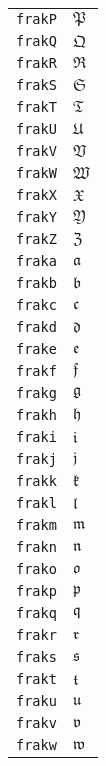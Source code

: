 \begin{longtable}{ll}
\texttt{frakP}&${}\mathfrak{P} {}$\\
\texttt{frakQ}&${}\mathfrak{Q} {}$\\
\texttt{frakR}&${}\mathfrak{R} {}$\\
\texttt{frakS}&${}\mathfrak{S} {}$\\
\texttt{frakT}&${}\mathfrak{T} {}$\\
\texttt{frakU}&${}\mathfrak{U} {}$\\
\texttt{frakV}&${}\mathfrak{V} {}$\\
\texttt{frakW}&${}\mathfrak{W} {}$\\
\texttt{frakX}&${}\mathfrak{X} {}$\\
\texttt{frakY}&${}\mathfrak{Y} {}$\\
\texttt{frakZ}&${}\mathfrak{Z} {}$\\
\texttt{fraka}&${}\mathfrak{a} {}$\\
\texttt{frakb}&${}\mathfrak{b} {}$\\
\texttt{frakc}&${}\mathfrak{c} {}$\\
\texttt{frakd}&${}\mathfrak{d} {}$\\
\texttt{frake}&${}\mathfrak{e} {}$\\
\texttt{frakf}&${}\mathfrak{f} {}$\\
\texttt{frakg}&${}\mathfrak{g} {}$\\
\texttt{frakh}&${}\mathfrak{h} {}$\\
\texttt{fraki}&${}\mathfrak{i} {}$\\
\texttt{frakj}&${}\mathfrak{j} {}$\\
\texttt{frakk}&${}\mathfrak{k} {}$\\
\texttt{frakl}&${}\mathfrak{l} {}$\\
\texttt{frakm}&${}\mathfrak{m} {}$\\
\texttt{frakn}&${}\mathfrak{n} {}$\\
\texttt{frako}&${}\mathfrak{o} {}$\\
\texttt{frakp}&${}\mathfrak{p} {}$\\
\texttt{frakq}&${}\mathfrak{q} {}$\\
\texttt{frakr}&${}\mathfrak{r} {}$\\
\texttt{fraks}&${}\mathfrak{s} {}$\\
\texttt{frakt}&${}\mathfrak{t} {}$\\
\texttt{fraku}&${}\mathfrak{u} {}$\\
\texttt{frakv}&${}\mathfrak{v} {}$\\
\texttt{frakw}&${}\mathfrak{w} {}$\\

\end{longtable}
